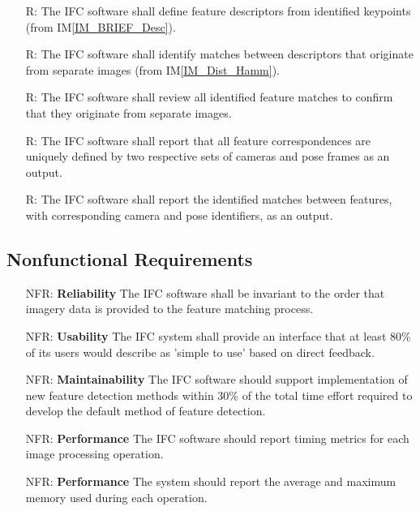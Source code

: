 \documentclass[12pt]{article}
\newcommand{\iref}[1]{IM\ref{#1}}
\newcounter{reqnum} %
\newcounter{nfrnum} %
\begin{document}
\begin{itemize}
\item[R\refstepcounter{reqnum}\thereqnum \label{R_DefineDescriptors}:] The IFC software shall 
define feature descriptors from identified keypoints (from \iref{IM_BRIEF_Desc}).

\item[R\refstepcounter{reqnum}\thereqnum \label{R_CompareDescriptors}:] The IFC software shall 
identify matches between descriptors that originate from separate images (from \iref{IM_Dist_Hamm}).

\item[R\refstepcounter{reqnum}\thereqnum \label{R_DistinctImages}:] The IFC software shall review 
all identified feature matches to confirm that they originate from separate images.

\item[R\refstepcounter{reqnum}\thereqnum \label{R_UniqueMatch_IDs}:] The IFC software shall report 
that all feature correspondences are uniquely defined by two respective sets of cameras and pose 
frames as an output.

\item[R\refstepcounter{reqnum}\thereqnum \label{R_OutputCorrespondences}:] The IFC software shall report 
the identified matches between features, with corresponding camera and pose identifiers, as an output.

\end{itemize}

\subsection{Nonfunctional Requirements}

\noindent \begin{itemize}

\item[NFR\refstepcounter{nfrnum}\thenfrnum \label{NFR_Rel_1}:] \textbf{Reliability}
The IFC software shall be invariant to the order that imagery data is provided to the feature 
matching process.

\item[NFR\refstepcounter{nfrnum}\thenfrnum \label{NFR_Use_1}:] \textbf{Usability}
The IFC system shall provide an interface that at least 80\% of its users would describe 
as 'simple to use' based on direct feedback.

\item[NFR\refstepcounter{nfrnum}\thenfrnum \label{NFR_Mtn_1}:] \textbf{Maintainability}
The IFC software should support implementation of new feature detection methods within 30\% 
of the total time effort required to develop the default method of feature detection.

\item[NFR\refstepcounter{nfrnum}\thenfrnum \label{NFR_Perf_1}:] \textbf{Performance}
The IFC software should report timing metrics for each image processing operation.

\item[NFR\refstepcounter{nfrnum}\thenfrnum \label{NFR_Perf_2}:] \textbf{Performance}
The system should report the average and maximum memory used during each operation.


\end{itemize}
\end{document}
